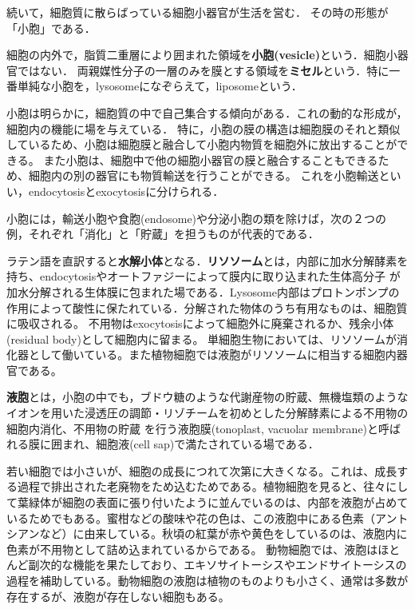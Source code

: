 \documentclass[uplatex, dvipdfmx]{jsreport}
\begin{document}
続いて，細胞質に散らばっている細胞小器官が生活を営む．
その時の形態が「小胞」である．

\begin{definition}
    細胞の内外で，脂質二重層により囲まれた領域を\textbf{小胞(vesicle)}という．細胞小器官ではない．
    両親媒性分子の一層のみを膜とする領域を\textbf{ミセル}という．特に一番単純な小胞を，lysosomeになぞらえて，liposomeという．

    小胞は明らかに，細胞質の中で自己集合する傾向がある．これの動的な形成が，細胞内の機能に場を与えている．
    特に，小胞の膜の構造は細胞膜のそれと類似しているため、小胞は細胞膜と融合して小胞内物質を細胞外に放出することができる。
    また小胞は、細胞中で他の細胞小器官の膜と融合することもできるため、細胞内の別の器官にも物質輸送を行うことができる。
    これを小胞輸送といい，endocytosisとexocytosisに分けられる．
\end{definition}

小胞には，輸送小胞や食胞(endosome)や分泌小胞の類を除けば，次の２つの例，それぞれ「消化」と「貯蔵」を担うものが代表的である．

\begin{definition}
    ラテン語を直訳すると\textbf{水解小体}となる．\textbf{リソソーム}とは，内部に加水分解酵素を持ち、endocytosisやオートファジーによって膜内に取り込まれた生体高分子
    が加水分解される生体膜に包まれた場である．Lysosome内部はプロトンポンプの作用によって酸性に保たれている．分解された物体のうち有用なものは、細胞質に吸収される。
    不用物はexocytosisによって細胞外に廃棄されるか、残余小体(residual body)として細胞内に留まる。
    単細胞生物においては、リソソームが消化器として働いている。また植物細胞では液胞がリソソームに相当する細胞内器官である。
\end{definition}

\begin{definition}
    \textbf{液胞}とは，小胞の中でも，ブドウ糖のような代謝産物の貯蔵、無機塩類のようなイオンを用いた浸透圧の調節・リゾチームを初めとした分解酵素による不用物の細胞内消化、不用物の貯蔵
    を行う液胞膜(tonoplast, vacuolar membrane)と呼ばれる膜に囲まれ、細胞液(cell sap)で満たされている場である．

    若い細胞では小さいが、細胞の成長につれて次第に大きくなる。これは、成長する過程で排出された老廃物をため込むためである。植物細胞を見ると、往々にして葉緑体が細胞の表面に張り付いたように並んでいるのは、内部を液胞が占めているためでもある。蜜柑などの酸味や花の色は、この液胞中にある色素（アントシアンなど）に由来している。秋頃の紅葉が赤や黄色をしているのは、液胞内に色素が不用物として詰め込まれているからである。
    動物細胞では、液胞はほとんど副次的な機能を果たしており、エキソサイトーシスやエンドサイトーシスの過程を補助している。動物細胞の液胞は植物のものよりも小さく、通常は多数が存在するが、液胞が存在しない細胞もある。
\end{definition}
\end{document}
